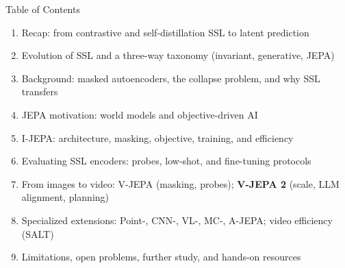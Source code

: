 \begin{frame}{Table of Contents}
  \begin{enumerate}\itemsep0.15em
    \item Recap: from contrastive and self-distillation SSL to latent prediction
    \item Evolution of SSL and a three-way taxonomy (invariant, generative, JEPA)
    \item Background: masked autoencoders, the collapse problem, and why SSL transfers
    \item JEPA motivation: world models and objective-driven AI
    \item I-JEPA: architecture, masking, objective, training, and efficiency
    \item Evaluating SSL encoders: probes, low-shot, and fine-tuning protocols
    \item From images to video: V-JEPA (masking, probes); \textbf{V-JEPA 2} (scale, LLM alignment, planning)
    \item Specialized extensions: Point-, CNN-, VL-, MC-, A-JEPA; video efficiency (SALT)
    \item Limitations, open problems, further study, and hands-on resources
  \end{enumerate}
\end{frame}
